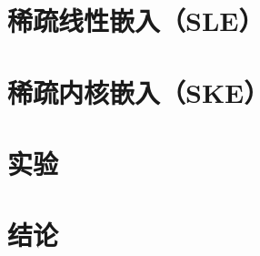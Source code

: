 \documentclass[UTF8,10pt,a4paper,twoside,fleqn,openany]{ctexbook}
\begin{document}
\section{稀疏线性嵌入（SLE）}

\section{稀疏内核嵌入（SKE）}

\section{实验}

\section{结论}


\begin{thebibliography}{99}
	
\end{thebibliography}
\end{document}
